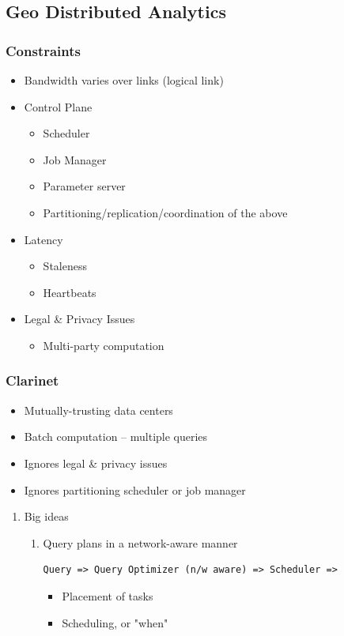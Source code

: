 \documentclass[11pt]{article}
\begin{document}
\subsection{Geo Distributed Analytics}
\label{sec:orgheadline22}
\subsubsection{Constraints}
\label{sec:orgheadline19}
\begin{itemize}
\item Bandwidth varies over links (logical link)
\item Control Plane
\begin{itemize}
\item Scheduler
\item Job Manager
\item Parameter server
\item Partitioning/replication/coordination of the above
\end{itemize}
\item Latency
\begin{itemize}
\item Staleness
\item Heartbeats
\end{itemize}
\item Legal \& Privacy Issues
\begin{itemize}
\item Multi-party computation
\end{itemize}
\end{itemize}

\subsubsection{Clarinet}
\label{sec:orgheadline21}
\begin{itemize}
\item Mutually-trusting data centers
\item Batch computation -- multiple queries
\item Ignores legal \& privacy issues
\item Ignores partitioning scheduler or job manager
\end{itemize}
\begin{enumerate}
\item Big ideas
\label{sec:orgheadline20}
\begin{enumerate}
\item Query plans in a network-aware manner
\begin{verbatim}Query => Query Optimizer (n/w aware) => Scheduler =>\end{verbatim}
\begin{itemize}
\item Placement of tasks
\item Scheduling, or "when"
\end{itemize}
\end{enumerate}
\end{enumerate}
\end{document}
